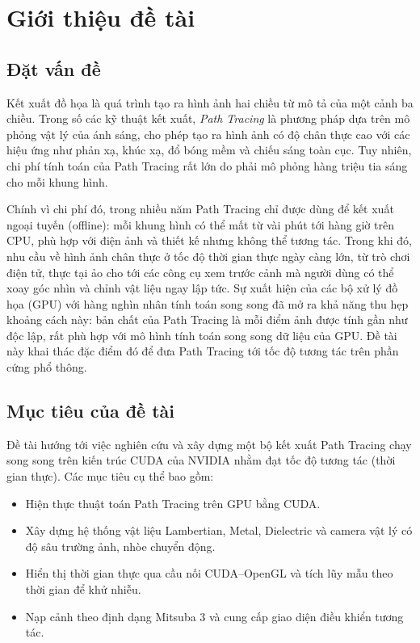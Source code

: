 \chapter{Giới thiệu đề tài}
\label{ch:gioi-thieu}

\section{Đặt vấn đề}
Kết xuất đồ họa là quá trình tạo ra hình ảnh hai chiều từ mô tả
của một cảnh ba chiều. Trong số các kỹ thuật kết xuất, \textit{Path Tracing}
là phương pháp dựa trên mô phỏng vật lý của ánh sáng, cho phép tạo ra hình ảnh
có độ chân thực cao với các hiệu ứng như phản xạ, khúc xạ, đổ bóng mềm và
chiếu sáng toàn cục. Tuy nhiên, chi phí tính toán của
Path Tracing rất lớn do phải mô phỏng hàng triệu tia sáng cho mỗi khung hình.

Chính vì chi phí đó, trong nhiều năm Path Tracing chỉ được dùng để kết xuất ngoại
tuyến (offline): mỗi khung hình có thể mất từ vài phút tới hàng giờ trên CPU, phù
hợp với điện ảnh và thiết kế nhưng không thể tương tác. Trong khi đó, nhu cầu về
hình ảnh chân thực ở tốc độ thời gian thực ngày càng lớn, từ trò chơi điện tử,
thực tại ảo cho tới các công cụ xem trước cảnh mà người dùng có thể xoay góc nhìn
và chỉnh vật liệu ngay lập tức. Sự xuất hiện của các bộ xử lý đồ họa (GPU) với
hàng nghìn nhân tính toán song song đã mở ra khả năng thu hẹp khoảng cách này:
bản chất của Path Tracing là mỗi điểm ảnh được tính gần như độc lập, rất phù hợp
với mô hình tính toán song song dữ liệu của GPU. Đề tài này khai thác đặc điểm đó
để đưa Path Tracing tới tốc độ tương tác trên phần cứng phổ thông.

\section{Mục tiêu của đề tài}
Đề tài hướng tới việc nghiên cứu và xây dựng một bộ kết xuất Path Tracing
chạy song song trên kiến trúc CUDA của NVIDIA nhằm đạt tốc độ tương tác
(thời gian thực). Các mục tiêu cụ thể bao gồm:
\begin{itemize}[noitemsep]
  \item Hiện thực thuật toán Path Tracing trên GPU bằng CUDA.
  \item Xây dựng hệ thống vật liệu Lambertian, Metal, Dielectric và camera vật lý
        có độ sâu trường ảnh, nhòe chuyển động.
  \item Hiển thị thời gian thực qua cầu nối CUDA--OpenGL và tích lũy mẫu theo
        thời gian để khử nhiễu.
  \item Nạp cảnh theo định dạng Mitsuba 3 và cung cấp giao diện điều khiển tương tác.
\end{itemize}

